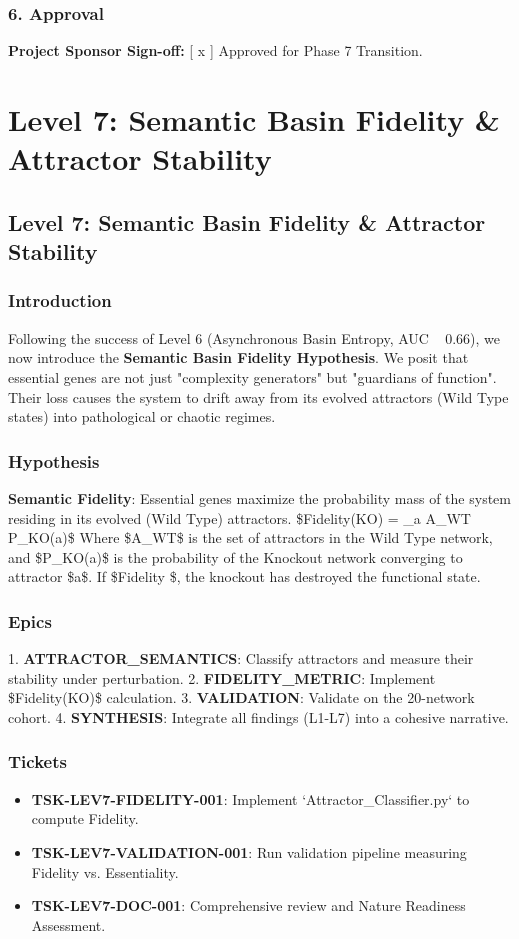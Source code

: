 \documentclass{article}
\begin{document}
\subsubsection{6. Approval}
\textbf{Project Sponsor Sign-off:}
[ x ] Approved for Phase 7 Transition.


\section{Level 7: Semantic Basin Fidelity \& Attractor Stability}
\subsection{Level 7: Semantic Basin Fidelity \& Attractor Stability}

\subsubsection{Introduction}
Following the success of Level 6 (Asynchronous Basin Entropy, AUC ~ 0.66), we now introduce the \textbf{Semantic Basin Fidelity Hypothesis}. We posit that essential genes are not just "complexity generators" but "guardians of function". Their loss causes the system to drift away from its evolved attractors (Wild Type states) into pathological or chaotic regimes.

\subsubsection{Hypothesis}
\textbf{Semantic Fidelity}: Essential genes maximize the probability mass of the system residing in its evolved (Wild Type) attractors.
\$Fidelity(KO) = \sum\_{a \in A\_{WT}} P\_{KO}(a)\$
Where \$A\_{WT}\$ is the set of attractors in the Wild Type network, and \$P\_{KO}(a)\$ is the probability of the Knockout network converging to attractor \$a\$.
If \$Fidelity \$, the knockout has destroyed the functional state.

\subsubsection{Epics}
1. \textbf{ATTRACTOR\_SEMANTICS}: Classify attractors and measure their stability under perturbation.
2. \textbf{FIDELITY\_METRIC}: Implement \$Fidelity(KO)\$ calculation.
3. \textbf{VALIDATION}: Validate on the 20-network cohort.
4. \textbf{SYNTHESIS}: Integrate all findings (L1-L7) into a cohesive narrative.

\subsubsection{Tickets}
\begin{itemize}
\item \textbf{TSK-LEV7-FIDELITY-001}: Implement `Attractor\_Classifier.py` to compute Fidelity.
\item \textbf{TSK-LEV7-VALIDATION-001}: Run validation pipeline measuring Fidelity vs. Essentiality.
\item \textbf{TSK-LEV7-DOC-001}: Comprehensive review and Nature Readiness Assessment.
\end{itemize}
\end{document}
